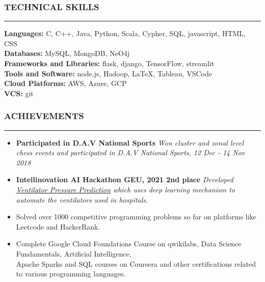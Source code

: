 \documentclass[a4paper]{article}
\begin{document}
\subsubsection*{TECHNICAL SKILLS}
\hrule
\vspace{10pt}
\textbf{Languages: } C, C++, Java, Python, Scala, Cypher, SQL, javascript, HTML, CSS \\
\textbf{Databases: } MySQL, MongoDB, NeO4j \\
\textbf{Frameworks and Libraries: } flask, django, TensorFlow, streamlit \\
\textbf{Tools and Software: } node.js, Hadoop, \LaTeX, Tableau, VSCode \\
\textbf{Cloud Platforms: } AWS, Azure, GCP \\
\textbf{VCS: } git

\subsubsection*{ACHIEVEMENTS}
\hrule
\vspace{10pt}

\begin{itemize}[leftmargin=*, nosep]
    \item \noindent \textbf{Participated in D.A.V National Sports} \textit{Won cluster and zonal level chess events and participated in D.A.V National Sports, 12 Dec - 14 Nov 2018}
    \item \noindent \textbf{Intellinovation AI Hackathon GEU, 2021 2nd place} \textit{Developed \href{https://www.github.com/Bot-7037/Ventilator-Pressure-Prediction}{Ventilator Pressure Prediction}
              which uses deep learning mechanism to automate the ventilators used in hospitals.}
    \item Solved over 1000 competitive programming problems so far on platforms like Leetcode and HackerRank.
    \item Complete Google Cloud Foundations Course on qwikilabs, Data Science Fundamentals, Artificial Intelligence, \\
          Apache Sparks and SQL courses on Coursera and other certifications related to various programming languages.
\end{itemize}
\end{document}
